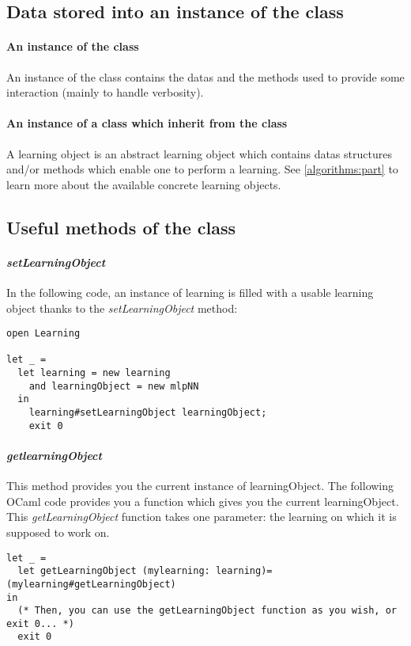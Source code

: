 \subsection{Data stored into an instance of the \textit{} class}
\paragraph{An instance of the \textit{} class}
An instance of the \textit{} class contains the datas and
the methods used to provide some interaction (mainly to handle
verbosity).

\paragraph{An instance of a class which inherit from
the \textit{} class}
A learning object is an abstract learning object which contains datas structures and/or methods  which enable one to perform a learning. See \vref{algorithms:part} to learn more about the available concrete learning objects.

\subsection{Useful methods of the \textit{} class}
\paragraph{\textit{setLearningObject}}
In the following code, an instance of learning is filled with a usable
learning object thanks to the \textit{setLearningObject} method:
\begin{verbatim}
open Learning

let _ =
  let learning = new learning
    and learningObject = new mlpNN
  in
    learning#setLearningObject learningObject;
    exit 0
\end{verbatim}

\paragraph{\textit{getlearningObject}}
This method provides you the current instance of learningObject. The
following OCaml code provides you a function which gives you the current
learningObject. This \textit{getLearningObject} function takes one parameter:
the learning on which it is supposed to work on.
\begin{verbatim}
let _ =
  let getLearningObject (mylearning: learning)= (mylearning#getLearningObject)
in
  (* Then, you can use the getLearningObject function as you wish, or exit 0... *)
  exit 0
\end{verbatim} 

